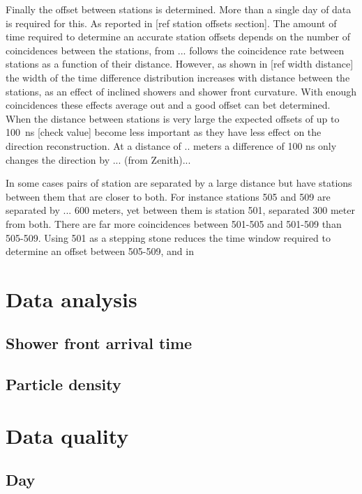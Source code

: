 Finally the offset between stations is determined. More than a single day of data is required for this. As reported in [ref station offsets section]. The amount of time required to determine an accurate station offsets depends on the number of coincidences between the stations, from ... follows the coincidence rate between stations as a function of their distance. However, as shown in [ref width distance] the width of the time difference distribution increases with distance between the stations, as an effect of inclined showers and shower front curvature. With enough coincidences these effects average out and a good offset can bet determined. When the distance between stations is very large the expected \gps offsets of up to \SI{100}{\ns} [check value] become less important as they have less effect on the direction reconstruction. At a distance of .. meters a difference of 100 ns only changes the direction by ... (from Zenith)...

In some cases pairs of station are separated by a large distance but have stations between them that are closer to both. For instance stations 505 and 509 are separated by ... 600 meters, yet between them is station 501, separated 300 meter from both. There are far more coincidences between 501-505 and 501-509 than 505-509. Using 501 as a stepping stone reduces the time window required to determine an offset between 505-509, and in


\section{Data analysis}

\subsection{Shower front arrival time}

\subsection{Particle density}


\section{Data quality}

\subsection{Day}

